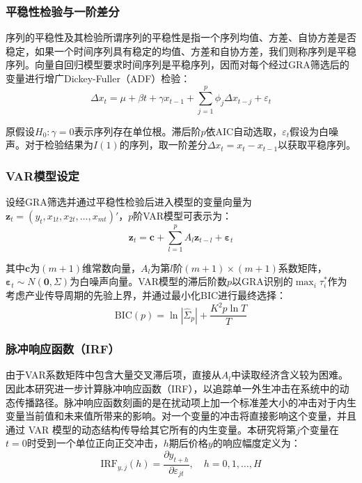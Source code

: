 \documentclass[a4paper,12pt,fontset=fandol]{ctexart}
\begin{document}
\subsubsection{平稳性检验与一阶差分}


序列的平稳性及其检验所谓序列的平稳性是指一个序列均值、方差、自协方差是否稳定，如果一个时间序列具有稳定的均值、方差和自协方差，我们则称序列是平稳序列。向量自回归模型要求时间序列是平稳序列，因而对每个经过GRA筛选后的变量进行增广Dickey-Fuller（ADF）检验：
\begin{equation}
\Delta x_t = \mu + \beta t + \gamma x_{t-1} + \sum_{j=1}^{p}\phi_j\Delta x_{t-j} + \varepsilon_t
\end{equation}

原假设$H_0:\gamma=0$表示序列存在单位根。滞后阶$p$依AIC自动选取，$\varepsilon_t$假设为白噪声。对于检验结果为$I(1)$的序列，取一阶差分$\Delta x_t = x_t - x_{t-1}$以获取平稳序列。

\subsubsection{VAR模型设定}

设经GRA筛选并通过平稳性检验后进入模型的变量向量为$\mathbf{z}_t=(y_t,x_{1t},x_{2t},\ldots,x_{mt})'$，$p$阶VAR模型可表示为：
\begin{equation}
\mathbf{z}_t = \mathbf{c} + \sum_{l=1}^{p}A_l\mathbf{z}_{t-l} + \boldsymbol{\varepsilon}_t
\end{equation}

其中$\mathbf{c}$为$(m+1)$维常数向量，$A_l$为第$l$阶$(m+1)\times(m+1)$系数矩阵，$\boldsymbol{\varepsilon}_t\sim N(\mathbf{0},\Sigma)$为白噪声向量。VAR模型的滞后阶数$p$以GRA识别的$\max_i\tau_i^*$作为考虑产业传导周期的先验上界，并通过最小化BIC进行最终选择：
\begin{equation}
\text{BIC}(p) = \ln|\hat{\Sigma}_p| + \frac{K^2 p\ln T}{T}
\end{equation}

\subsubsection{脉冲响应函数（IRF）}

由于VAR系数矩阵中包含大量交叉滞后项，直接从$A_l$中读取经济含义较为困难。因此本研究进一步计算脉冲响应函数（IRF），以追踪单一外生冲击在系统中的动态传播路径。脉冲响应函数刻画的是在扰动项上加一个标准差大小的冲击对于内生变量当前值和未来值所带来的影响。对一个变量的冲击将直接影响这个变量，并且通过 VAR 模型的动态结构传导给其它所有的内生变量。本研究将第$j$个变量在$t=0$时受到一个单位正向正交冲击，$h$期后价格$y$的响应幅度定义为：
\begin{equation}
\text{IRF}_{y,j}(h) = \frac{\partial y_{t+h}}{\partial \varepsilon_{jt}},\quad h=0,1,\ldots,H
\end{equation}
\end{document}
